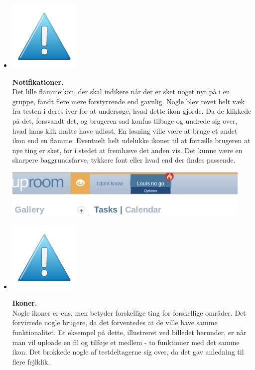 \documentclass[12pt]{article}
\begin{document}
\begin{itemize}
   \item[]       \begin{minipage}{0.07\linewidth}
  \includegraphics[scale=0.3]{Billeder/mindre}
          \end{minipage} \textbf{Notifikationer.}\\ Det lille flammeikon, der skal indikere når der er sket noget nyt på i en gruppe, fandt flere mere forstyrrende end gavnlig. Nogle blev revet helt væk fra testen i deres iver for at undersøge, hvad dette ikon gjorde. Da de klikkede på det, forsvandt det, og brugeren sad konfus tilbage og undrede sig over, hvad hans klik måtte have udløst. En løsning ville være at bruge et andet ikon end en flamme. Eventuelt helt udelukke ikoner til at fortælle brugeren at nye ting er sket, for i stedet at fremhæve det anden vis. Det kunne være en skarpere baggrundsfarve, tykkere font eller hvad end der findes passende.
  
      \begin{center}\includegraphics[scale=0.5]{Billeder/Delete-Member2}\end{center} 
   \item[]       \begin{minipage}{0.07\linewidth}
  \includegraphics[scale=0.3]{Billeder/mindre}
          \end{minipage} \textbf{Ikoner.}\\
           Nogle ikoner er ens, men betyder forskellige ting for forskellige områder. Det forvirrede nogle brugere, da det forventedes at de ville have samme funktionalitet. Et eksempel på dette, illustreret ved billedet herunder, er når man vil uploade en fil og tilføje et medlem - to funktioner med det samme ikon. Det brokkede nogle af testdeltagerne sig over, da det gav anledning til flere fejlklik.
  

\end{itemize}
\end{document}

